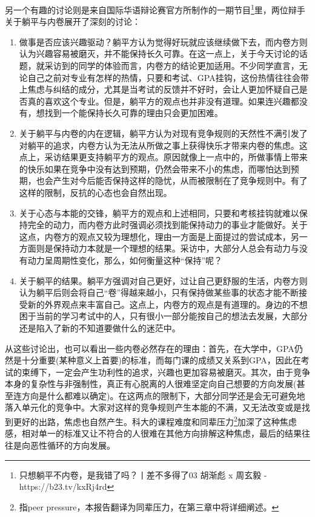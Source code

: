 \documentclass[UTF8,a4paper,fontset=windows,11pt,openany]{ctexbook}
\begin{document}
另一个有趣的讨论则是来自国际华语辩论赛官方所制作的一期节目\footnote{只想躺平不内卷，是我错了吗？丨差不多得了03 胡渐彪 x 周玄毅 - https://b23.tv/kxRj4rd}里，两位辩手关于躺平与内卷展开了深刻的讨论：
\begin{enumerate}
    \item 做事是否应该兴趣驱动？躺平方认为觉得好玩就应该继续做下去，而内卷方则认为兴趣容易被磨灭，并不能保持长久可靠。在这一点上，关于今天讨论的话题，就采访到的同学的体验而言，内卷方的结论更加适用。不少同学直言，无论自己之前对专业有怎样的热情，只要和考试、GPA挂钩，这份热情往往会带上焦虑与纠结的成分，尤其是当考试的反馈并不好时，会让人更加怀疑自己是否真的喜欢这个专业。但是，躺平方的观点也并非没有道理。如果连兴趣都没有，想找到一个能保持长久可靠的理由只会更加困难。
    \item 关于躺平与内卷的内在逻辑，躺平方认为对现有竞争规则的天然性不满引发了对躺平的追求，内卷方认为无法从所做之事上获得快乐才带来内卷的焦虑。这点上，采访结果更支持躺平方的观点。原因就像上一点中的，所做事情上带来的快乐如果在竞争中没有达到预期，仍然会带来不小的焦虑，而哪怕达到预期，也会产生对今后能否保持这样的隐忧，从而被限制在了竞争规则中。有了这样的限制，反抗的心态也会自然出现。
    \item 关于心态与本能的交锋，躺平方的观点和上述相同，只要和考核挂钩就难以保持完全的动力，而内卷方此时强调必须找到能保持动力的事业才能做好。关于这点，内卷方的观点又较为理想化，理由一方面是上面提过的尝试成本，另一方面则是保持动力本就是一个理想的结果。采访中，大部分人总会有动力与没有动力呈周期性变化，那么，如何衡量这种“保持”呢？
    \item 关于躺平的结果。躺平方强调对自己更好，过让自己更舒服的生活，内卷方则认为躺平后则会将自己“卷”得越来越小，只有保持做某些事的状态才能不断接受新的外界观点来丰富自己。这点上，内卷方的观点是有道理的。身边的不想困于当前的学习考试中的人，只有很小一部分能按自己的想法去发展，大部分还是陷入了新的不知道要做什么的迷茫中。
\end{enumerate}

从这些讨论出，也可以看出一些内卷必然存在的理由：首先，在大学中，GPA仍然是十分重要(某种意义上首要)的标准，而每门课的成绩又关系到GPA，因此在考试的束缚下，一定会产生功利性的追求，兴趣也更加容易被磨灭。其次，由于竞争本身的复杂性与非强制性，真正有心脱离的人很难坚定向自己想要的方向发展(甚至连方向是什么都难以确定)。在这两点的限制下，大部分同学还是会无可避免地落入单元化的竞争中。大家对这样的竞争规则产生本能的不满，又无法改变或是找到更好的出路，焦虑也自然产生。科大的课程难度和同辈压力\footnote{指peer pressure，本报告翻译为同辈压力，在第三章中将详细阐述。}加深了这种焦虑感，相对单一的标准又让不符合的人很难在其他方向排解这种焦虑，最后的结果往往是向恶性循环的方向发展。
\end{document}
